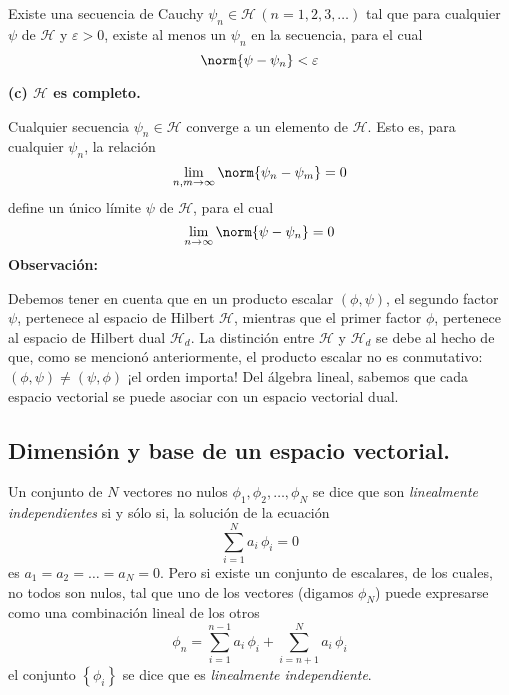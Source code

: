 Existe una secuencia de Cauchy $\psi_{n} \in \mathcal{H} \, (n = 1, 2, 3, \ldots)$ tal que para cualquier $\psi$ de $\mathcal{H}$ y $\varepsilon > 0$, existe al menos un $\psi_{n}$ en la secuencia, para el cual
\begin{equation}
\norm{ \psi - \psi_{n}} < \varepsilon
\label{eq:ecuacion_02_08}
\end{equation}

\textbf{(c) $\mathcal{H}$ es completo.}

Cualquier secuencia $\psi_{n} \in \mathcal{H}$ converge a un elemento de $\mathcal{H}$. Esto es, para cualquier $\psi_{n}$, la relación
\begin{equation}
\lim_{n, m \to \infty} \norm{\psi_{n} - \psi_{m}} = 0
\label{eq:ecuacion_02_09}
\end{equation}
define un único límite $\psi$ de $\mathcal{H}$, para el cual
\begin{equation}
\lim_{n \to \infty} \norm{\psi - \psi_{n}} = 0
\label{eq:ecuacion_02_10}
\end{equation}
\textbf{Observación:}

Debemos tener en cuenta que en un producto escalar $(\phi, \psi)$, el segundo factor $\psi$, pertenece al espacio de Hilbert $\mathcal{H}$, mientras que el primer factor $\phi$, pertenece al espacio de Hilbert dual $\mathcal{H}_{d}$. La distinción entre $\mathcal{H}$ y $\mathcal{H}_{d}$ se debe al hecho de que, como se mencionó anteriormente, el producto escalar no es conmutativo: $(\phi, \psi) \neq (\psi, \phi)$ ¡el orden importa! Del álgebra lineal, sabemos que cada espacio vectorial se puede asociar con un espacio vectorial dual.
\subsection{Dimensión y base de un espacio vectorial.}
Un conjunto de $N$ vectores no nulos $\phi_{1}, \phi_{2}, \ldots, \phi_{N}$ se dice que son \emph{linealmente independientes} si y sólo si, la solución de la ecuación
\begin{equation}
\sum_{i=1}^{N} a_{i} \, \phi_{i} = 0
\label{eq:ecuacion_02_11}
\end{equation}
es $a_{1} = a_{2} = \ldots = a_{N} = 0$. Pero si existe un conjunto de escalares, de los cuales, no todos son nulos, tal que uno de los vectores (digamos $\phi_{N}$) puede expresarse como una combinación lineal de los otros
\begin{equation}
\phi_{n} = \sum_{i=1}^{n-1} a_{i} \, \phi_{i} + \sum_{i=n+1}^{N} a_{i} \, \phi_{i}
\label{eq:ecuacion_02_12} 
\end{equation} 
el conjunto $\left\{ \phi_{i} \right\}$ se dice que es \emph{linealmente independiente}.

